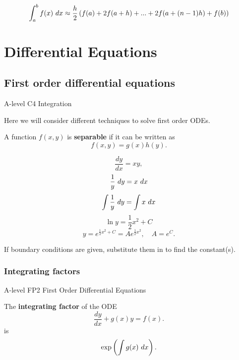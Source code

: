 \documentclass[11pt,a4paper,oneside]{book}
\begin{document}
\begin{in_a_box}
$$\int_a^b f(x) \dx \approx \frac{h}2\left(f(a)+2f(a+h)+...+2f(a+(n-1)h)+f(b)\right)$$
\end{in_a_box}

\chapter{Differential Equations}

\section{First order differential equations}
\begin{gce}
A-level C4 Integration
\end{gce}
Here we will consider different techniques to solve first order ODEs.

\begin{definition}
A function $f(x,y)$ is \textbf{separable} if it can be written as
\[f(x,y)=g(x)h(y).\]
\end{definition}

\begin{example}
\[\frac{dy}{dx}=xy,\]
\[\frac{1}{y}\dx[y]=x\dx\]
$$\int\frac{1}{y}\dx[y]=\int x\dx$$
$$\ln y=\frac{1}{2}x^2 +C$$
\[y=e^{\frac{1}{2}x^2+C}=Ae^{\frac{1}{2}x^2},\quad A=e^C.\]
\end{example}

If boundary conditions are given, substitute them in to find the constant(s).

\subsection{Integrating factors}
\begin{gce}
A-level FP2 First Order Differential Equations
\end{gce}
\begin{definition}
The \textbf{integrating factor} of the ODE 
\[\frac{dy}{dx}+g(x)y=f(x).\]
is 
\[\exp\left({\int g(x)\dx}\right).\]
\end{definition}
\end{document}
